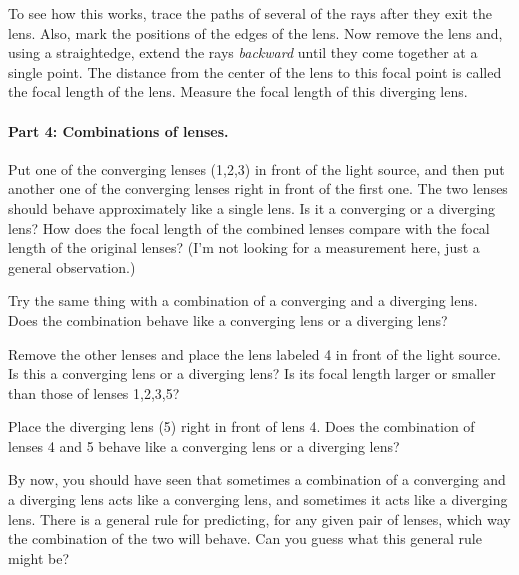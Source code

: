 To see how this works, trace the paths of several of the rays 
after they exit the lens.  Also, mark the positions of the edges
of the lens.  Now remove the lens and, using a straightedge, extend
the rays {\it backward} until they come together at a single point.  
The distance from the center of the lens to this focal point is
called the focal length of the lens.  Measure the focal length
of this diverging lens.

\answerspace{1.0in}

\paragraph{Part 4: Combinations of lenses.}
Put one of the converging lenses (1,2,3) in front of the light source, and
then put another one of the converging lenses right in front of the first
one.  The two lenses should behave approximately like a single lens.
Is it a converging or a diverging lens?  How does the focal length of
the combined lenses compare with the focal length of the original
lenses?  (I'm not looking for a measurement here, just a general
observation.)

\answerspace{1.4in}

\pagebreak[2]
Try the same thing with a combination of a converging and a diverging
lens.  Does the combination behave like a converging lens or a diverging
lens?  

\answerspace{1.4in}

Remove the other lenses and place the lens labeled 4 in front
of the light source.  Is this a converging lens or a diverging lens?
Is its focal length larger or smaller than those of lenses 1,2,3,5?

\answerspace{1.4in}

Place the diverging lens (5) right in front of lens 4.  Does the combination
of lenses 4 and 5 behave like a converging lens or a diverging lens?

\answerspace{1.4in}

By now, you should have seen that sometimes a combination of a converging
and a diverging lens acts like a converging lens, and sometimes it
acts like a diverging lens.  There is a general rule for predicting,
for any given pair of lenses, which way the combination of the two
will behave.  Can you guess what this general rule might be?

\answerspace{0.7in}

